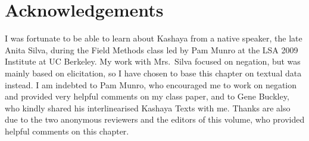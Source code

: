 \documentclass[output=paper,modfonts,nonflat,colorlinks,citecolor=brown]{langscibook}
\begin{document}
\section*{Acknowledgements}
I was fortunate to be able to learn about Kashaya from a native speaker, the late Anita Silva, during the Field Methods class led by Pam Munro at the LSA 2009 Institute at UC Berkeley. My work with Mrs.\ Silva focused on negation, but was mainly based on elicitation, so I have chosen to base this chapter on textual data instead. I am indebted to Pam Munro, who encouraged me to work on negation and provided very helpful comments on my class paper, and to Gene Buckley, who kindly shared his interlinearised Kashaya Texts with me. Thanks are also due to the two anonymous reviewers and the editors of this volume, who provided helpful comments on this chapter.
\end{document}
